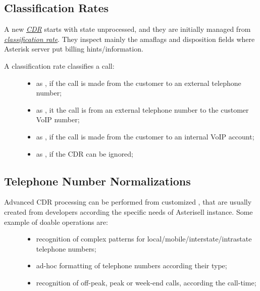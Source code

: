 \documentclass[letterpaper,10pt,english]{sphinxmanual}
\begin{document}
\subsection{Classification Rates}
\label{index:classification-rates}
A new {\hyperref[index:term-cdr]{\emph{CDR}}} starts with state unprocessed, and they are initially managed from {\hyperref[index:term-classification-rate]{\emph{classification rate}}}. They inspect mainly the amaflags and disposition fields where Asterisk server put billing hints/information.
\begin{description}
\item[{A classification rate classifies a call:}] \leavevmode\begin{itemize}
\item {} 
as , if the call is made from the customer to an external telephone number;

\item {} 
as , it the call is from an external telephone number to the customer VoIP number;

\item {} 
as , if the call is made from the customer to an internal VoIP account;

\item {} 
as , if the CDR can be ignored;

\end{itemize}

\end{description}


\subsection{Telephone Number Normalizations}
\label{index:telephone-number-normalizations}\begin{description}
\item[{Advanced CDR processing can be performed from customized , that are usually created from developers according the specific needs of Asterisell instance. Some example of doable operations are:}] \leavevmode\begin{itemize}
\item {} 
recognition of complex patterns for local/mobile/interstate/intrastate telephone numbers;

\item {} 
ad-hoc formatting of telephone numbers according their type;

\item {} 
recognition of off-peak, peak or week-end calls, according the call-time;

\end{itemize}

\end{description}
\end{document}
